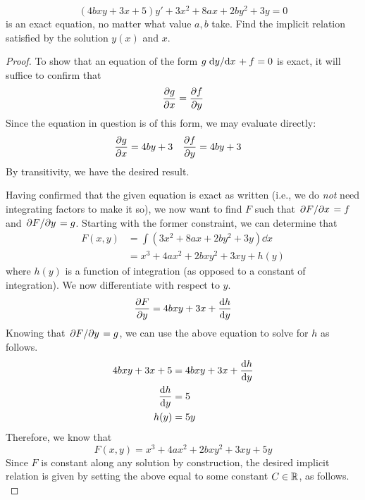 \documentclass[../psets.tex]{subfiles}
\begin{document}
\begin{enumerate}
\begin{equation*}
        (4bxy+3x+5)y'+3x^2+8ax+2by^2+3y = 0
    \end{equation*}
    is an exact equation, no matter what value $a,b$ take. Find the implicit relation satisfied by the solution $y(x)$ and $x$.
    \begin{proof}
        To show that an equation of the form $g\dv*{y}{x}+f=0$ is exact, it will suffice to confirm that
        \begin{equation*}
            \pdv{g}{x} = \pdv{f}{y}
        \end{equation*}
        Since the equation in question is of this form, we may evaluate directly:
        \begin{align*}
            \pdv{g}{x} &= 4by+3&
            \pdv{f}{y} &= 4by+3
        \end{align*}
        By transitivity, we have the desired result.\par
        Having confirmed that the given equation is exact as written (i.e., we do \emph{not} need integrating factors to make it so), we now want to find $F$ such that $\pdv*{F}{x}=f$ and $\pdv*{F}{y}=g$. Starting with the former constraint, we can determine that
        \begin{align*}
            F(x,y) &= \int(3x^2+8ax+2by^2+3y)\dd{x}\\
            &= x^3+4ax^2+2bxy^2+3xy+h(y)
        \end{align*}
        where $h(y)$ is a function of integration (as opposed to a constant of integration). We now differentiate with respect to $y$.
        \begin{equation*}
            \pdv{F}{y} = 4bxy+3x+\dv{h}{y}
        \end{equation*}
        Knowing that $\pdv*{F}{y}=g$, we can use the above equation to solve for $h$ as follows.
        \begin{align*}
            4bxy+3x+5 &= 4bxy+3x+\dv{h}{y}\\
            \dv{h}{y} &= 5\\
            h(y) &= 5y
        \end{align*}
        Therefore, we know that
        \begin{equation*}
            F(x,y) = x^3+4ax^2+2bxy^2+3xy+5y
        \end{equation*}
        Since $F$ is constant along any solution by construction, the desired implicit relation is given by setting the above equal to some constant $C\in\mathbb{R}$, as follows.
        \begin{equation*}

\end{equation*}
\end{proof}
\end{enumerate}
\end{document}
